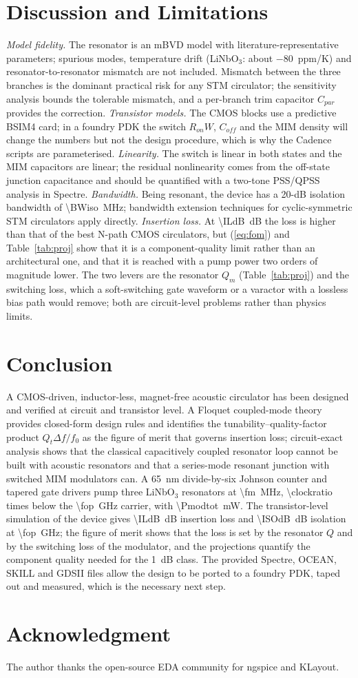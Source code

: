 \documentclass[journal]{IEEEtran}
\begin{document}
\section{Discussion and Limitations}
\emph{Model fidelity.} The resonator is an mBVD model with literature-representative parameters; spurious modes, temperature drift (LiNbO$_3$: about \SI{-80}{ppm/K}) and resonator-to-resonator mismatch are not included. Mismatch between the three branches is the dominant practical risk for any STM circulator; the sensitivity analysis bounds the tolerable mismatch, and a per-branch trim capacitor $C_{par}$ provides the correction. \emph{Transistor models.} The CMOS blocks use a predictive BSIM4 card; in a foundry PDK the switch $R_{on}W$, $C_{off}$ and the MIM density will change the numbers but not the design procedure, which is why the Cadence scripts are parameterised. \emph{Linearity.} The switch is linear in both states and the MIM capacitors are linear; the residual nonlinearity comes from the off-state junction capacitance and should be quantified with a two-tone PSS/QPSS analysis in Spectre. \emph{Bandwidth.} Being resonant, the device has a 20-dB isolation bandwidth of \SI{\BWiso}{MHz}; bandwidth extension techniques for cyclic-symmetric STM circulators \cite{kord2018broadband} apply directly. \emph{Insertion loss.} At \SI{\ILdB}{dB} the loss is higher than that of the best N-path CMOS circulators, but (\ref{eq:fom}) and Table~\ref{tab:proj} show that it is a component-quality limit rather than an architectural one, and that it is reached with a pump power two orders of magnitude lower. The two levers are the resonator $Q_m$ (Table~\ref{tab:proj}) and the switching loss, which a soft-switching gate waveform or a varactor with a lossless bias path would remove; both are circuit-level problems rather than physics limits.

\section{Conclusion}
A CMOS-driven, inductor-less, magnet-free acoustic circulator has been designed and verified at circuit and transistor level. A Floquet coupled-mode theory provides closed-form design rules and identifies the tunability--quality-factor product $Q_t\Delta f/f_0$ as the figure of merit that governs insertion loss; circuit-exact analysis shows that the classical capacitively coupled resonator loop cannot be built with acoustic resonators and that a series-mode resonant junction with switched MIM modulators can. A \SI{65}{nm} divide-by-six Johnson counter and tapered gate drivers pump three LiNbO$_3$ resonators at \SI{\fm}{MHz}, \num{\clockratio} times below the \SI{\fop}{GHz} carrier, with \SI{\Pmodtot}{mW}. The transistor-level simulation of the device gives \SI{\ILdB}{dB} insertion loss and \SI{\ISOdB}{dB} isolation at \SI{\fop}{GHz}; the figure of merit shows that the loss is set by the resonator $Q$ and by the switching loss of the modulator, and the projections quantify the component quality needed for the \SI{1}{dB} class. The provided Spectre, OCEAN, SKILL and GDSII files allow the design to be ported to a foundry PDK, taped out and measured, which is the necessary next step.

\section*{Acknowledgment}
The author thanks the open-source EDA community for ngspice and KLayout.



\end{document}
